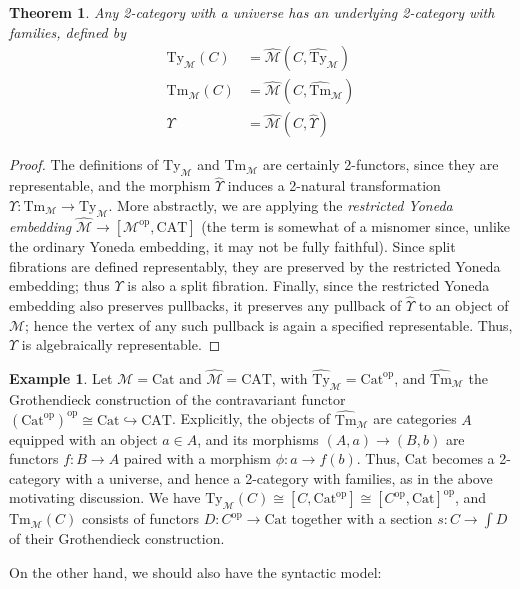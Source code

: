 \documentclass[10pt]{article}
\newtheorem{theorem}{Theorem}
\theoremstyle{definition}
\newtheorem{example}{Example}
\newcommand\op{^{\mathrm{op}}}
\newcommand\Cat{\mathrm{Cat}}
\newcommand\CAT{\mathrm{CAT}}
\newcommand\M{\mathcal{M}}
\newcommand\Mhat{\widehat{\mathcal{M}}}
\newcommand\Mty{{\mathrm{Ty}_{\M}}}
\newcommand\Mtm{{\mathrm{Tm}_{\M}}}
\newcommand\Mtyhat{{\widehat{\mathrm{Ty}}_{\M}}}
\newcommand\Mtmhat{{\widehat{\mathrm{Tm}}_{\M}}}
\newcommand\Ups{\Upsilon}
\newcommand\Upshat{{\widehat{\Upsilon}}}
\begin{document}
\begin{theorem}\label{thm:2cwf-univ}
  Any 2-category with a universe has an underlying 2-category with families, defined by
  \begin{align*}
    \Mty(C) &= \Mhat(C,\Mtyhat)\\
    \Mtm(C) &= \Mhat(C,\Mtmhat)\\
    \Ups &= \Mhat(C,\Upshat)
  \end{align*}
\end{theorem}
\begin{proof}
  The definitions of $\Mty$ and $\Mtm$ are certainly 2-functors, since they are representable, and the morphism $\Upshat$ induces a 2-natural transformation $\Ups:\Mtm\to\Mty$.
  More abstractly, we are applying the \emph{restricted Yoneda embedding} $\Mhat \to [\M\op,\CAT]$ (the term is somewhat of a misnomer since, unlike the ordinary Yoneda embedding, it may not be fully faithful).
  Since split fibrations are defined representably, they are preserved by the restricted Yoneda embedding; thus $\Ups$ is also a split fibration.
  Finally, since the restricted Yoneda embedding also preserves pullbacks, it preserves any pullback of $\Upshat$ to an object of $\M$; hence the vertex of any such pullback is again a specified representable.
  Thus, $\Ups$ is algebraically representable.
\end{proof}

\begin{example}\label{eg:cat-2cwf}
  Let $\M=\Cat$ and $\Mhat=\CAT$, with $\Mtyhat = \Cat\op$, and $\Mtmhat$ the Grothendieck construction of the contravariant functor $(\Cat\op)\op \cong \Cat \hookrightarrow \CAT$.
  Explicitly, the objects of $\Mtmhat$ are categories $A$ equipped with an object $a\in A$, and its morphisms $(A,a) \to (B,b)$ are functors $f:B\to A$ paired with a morphism $\phi : a\to f(b)$.
  Thus, $\Cat$ becomes a 2-category with a universe, and hence a 2-category with families, as in the above motivating discussion.
  We have $\Mty(C) \cong [C,\Cat\op] \cong [C\op,\Cat]\op$, and $\Mtm(C)$ consists of functors $D:C\op\to\Cat$ together with a section $s:C\to \int D$ of their Grothendieck construction.
\end{example}

On the other hand, we should also have the syntactic model:
\end{document}
